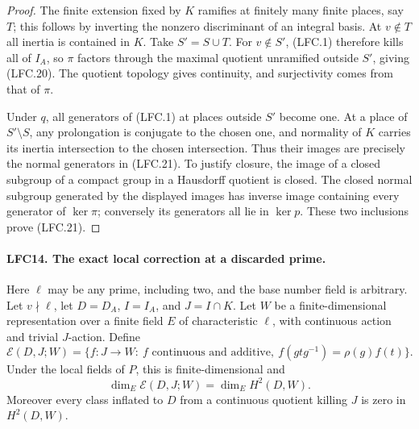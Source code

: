 \documentclass[11pt,a4paper]{article}
\numberwithin{equation}{section}
\theoremstyle{remark}\newtheorem{remark}[theorem]{Remark}
\begin{document}
\begin{proof}
The finite extension fixed by \(K\) ramifies at finitely
many finite places, say \(T\); this follows by inverting
the nonzero discriminant of an integral basis.
At \(v\notin T\) all inertia is contained in \(K\).
Take \(S'=S\cup T\).
For \(v\notin S'\), (LFC.1) therefore kills all of \(I_A\),
so \(\pi\) factors through the maximal quotient
unramified outside \(S'\), giving (LFC.20).
The quotient topology gives continuity, and surjectivity
comes from that of \(\pi\).

Under \(q\), all generators of (LFC.1) at places outside
\(S'\) become one.  At a place of \(S'\setminus S\),
any prolongation is conjugate to the chosen one, and
normality of \(K\) carries its inertia intersection to
the chosen intersection.  Thus their images are precisely
the normal generators in (LFC.21).
To justify closure, the image of a closed subgroup of a
compact group in a Hausdorff quotient is closed.
The closed normal subgroup generated by the displayed
images has inverse image containing every generator
of \(\ker\pi\); conversely its generators all lie in
\(\ker p\).  These two inclusions prove (LFC.21).
\end{proof}

\paragraph{LFC14. The exact local correction at a discarded prime.}
\label{claim:LFC14}
Here \(\ell\) may be any prime, including two, and the
base number field is arbitrary.
Let \(v\nmid\ell\), let \(D=D_A\), \(I=I_A\), and
\(J=I\cap K\).  Let \(W\) be a finite-dimensional
representation over a finite field \(E\) of characteristic
\(\ell\), with continuous action and trivial \(J\)-action.
Define
\[
 \mathcal E(D,J;W)=
 \{f:J\to W:\ f\text{ continuous and additive},\
                     f(g t g^{-1})=\rho(g)f(t)\}.
 \]
Under the local fields of \(P\), this is finite-dimensional and
\[
              \dim_E\mathcal E(D,J;W)=\dim_E H^2(D,W).
                                                        \tag{LFC.22}
\]
Moreover every class inflated to \(D\) from a continuous
quotient killing \(J\) is zero in \(H^2(D,W)\).
\end{document}
